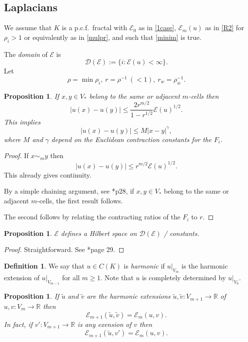 \documentclass[a4paper]{amsart}
\theoremstyle{plain}
\newtheorem{proposition}[theorem]{Proposition}
\theoremstyle{definition}
\newtheorem{definition}[theorem]{Definition}%
\theoremstyle{remark}
\begin{document}
\subsection{Laplacians}  \label{seclap} We assume that $ K $ is a p.c.f.\ fractal with $ \mathcal{E} _0 $ as in \eqref{1case},  $ \mathcal{E} _m (u) $ as in \eqref{R2} for $ \rho_i > 1 $ or equivalently as in \eqref{mulpr}, and such that \eqref{minim} is true.

The \emph{domain} of $ \mathcal{E} $ is 
\[
\mathcal{D} ( \mathcal{E} ) := \{ i : \mathcal{E} (u) < \infty   \}.
\]
Let
 \[
\rho = \min \rho_i , \ r = \rho^{-1}\  (< 1),\  r_w = \rho_w^{-1}.
 \]

\begin{proposition} If $ x,y \in V_* $ belong to the same or adjacent $ m $-cells then
\[
|u(x) - u(y) | \leq \frac{ 2 r ^{m/2} }{ 1 - r^{1/2} } \mathcal{E} (u)^{1/2}.
\]
This implies 
\[
|u(x) - u(y) | \leq M |x-y|^ \gamma ,
\]
where $ M $ and $ \gamma $ depend  on the Euclidean contraction constants for the $ F_i $.
\end{proposition} 

\begin{proof}
If $ x \sim_m y $ then
\[
|u(x)- u(y) | \leq r^{m/2} \mathcal{E} (u)^{1/2}.
\]
This already gives continuity.

By a simple chaining argument, see \cite{Str}*{p28}, if $ x , y \in V_*$ belong to the same or adjacent $ m $-cells, the first result follows.

The second follows by relating the contracting ratios of the $ F_i $ to $ r $.
\end{proof} 



\begin{proposition} $ \mathcal{E} $ defines a Hilbert space on $ \mathcal{D} ( \mathcal{E} )$  / constants.
\end{proposition} 

\begin{proof} Straightforward.  See \cite{Str}*{page 29}.
\end{proof} 

\begin{definition} \label{dfhar} We say that $ u \in C(K)$ is \emph{harmonic} if $ u|_{V_m} $ is the harmonic extension of $ u|_{V_{m-1}} $
for  all $ m\geq 1 $.  Note that $ u $ is completely determined by $ u|_{V_0} $. 
\end{definition} 

\begin{proposition} \label{hebl} If $ \widetilde{ u } $ and $ \widetilde{v} $ are the harmonic extensions $  \widetilde{ u } , \widetilde{v} :V_{m+1} \to \mathbb{R} $ 
of $ u,v :V_m \to \mathbb{R} $ then
\[
\mathcal{E} _{m+1}(  \widetilde{ u } ,  \widetilde{ v }  )= \mathcal{E} _m (u,v) .
\]
In fact, if $ v':V_{m+1} \to \mathbb{R} $ is any exension of $ v $ then 
\[
\mathcal{E} _{m+1}(  \widetilde{ u } ,  v'  )= \mathcal{E} _m (u,v) .
\]
\end{proposition}
\end{document}
